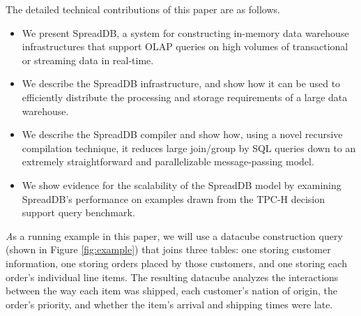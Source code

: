 The detailed technical contributions of this paper are as follows.
\begin{itemize}
\item We present SpreadDB, a system for constructing in-memory data warehouse infrastructures that support OLAP queries on high volumes of transactional or streaming data in real-time.

\item We describe the SpreadDB infrastructure, and show how it can be used to efficiently distribute the processing and storage requirements of a large data warehouse.

\item We describe the SpreadDB compiler and show how, using a novel recursive compilation technique, it reduces large join/group by SQL queries down to an extremely straightforward and parallelizable message-passing model. 

\item We show evidence for the scalability of the SpreadDB model by examining SpreadDB's performance on examples drawn from the TPC-H\cite{tpch2008} decision support query benchmark. 
\end{itemize}

\begin{example}\textit
As a running example in this paper, we will use a datacube construction query (shown in Figure \ref{fig:example}) that joins three tables: one storing customer information, one storing orders placed by those customers, and one storing each order's individual line items.  The resulting datacube analyzes the interactions between the way each item was shipped, each customer's nation of origin, the order's priority, and whether the item's arrival and shipping times were late.
\end{example}


